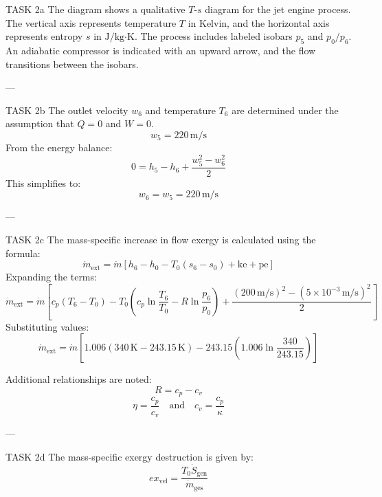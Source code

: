 TASK 2a  
The diagram shows a qualitative \( T \)-\( s \) diagram for the jet engine process. The vertical axis represents temperature \( T \) in Kelvin, and the horizontal axis represents entropy \( s \) in \( \text{J/kg·K} \). The process includes labeled isobars \( p_5 \) and \( p_0/p_6 \). An adiabatic compressor is indicated with an upward arrow, and the flow transitions between the isobars.  

---

TASK 2b  
The outlet velocity \( w_6 \) and temperature \( T_6 \) are determined under the assumption that \( Q = 0 \) and \( W = 0 \).  
\[
w_5 = 220 \, \text{m/s}
\]  
From the energy balance:  
\[
0 = h_5 - h_6 + \frac{w_5^2 - w_6^2}{2}
\]  
This simplifies to:  
\[
w_6 = w_5 = 220 \, \text{m/s}
\]  

---

TASK 2c  
The mass-specific increase in flow exergy is calculated using the formula:  
\[
\dot{m}_{\text{ext}} = \dot{m} \left[ h_6 - h_0 - T_0 (s_6 - s_0) + \text{ke} + \text{pe} \right]
\]  
Expanding the terms:  
\[
\dot{m}_{\text{ext}} = \dot{m} \left[ c_p (T_6 - T_0) - T_0 \left( c_p \ln \frac{T_6}{T_0} - R \ln \frac{p_6}{p_0} \right) + \frac{(200 \, \text{m/s})^2 - (5 \times 10^{-3} \, \text{m/s})^2}{2} \right]
\]  
Substituting values:  
\[
\dot{m}_{\text{ext}} = \dot{m} \left[ 1.006 (340 \, \text{K} - 243.15 \, \text{K}) - 243.15 \left( 1.006 \ln \frac{340}{243.15} \right) \right]
\]  

Additional relationships are noted:  
\[
R = c_p - c_v
\]  
\[
\eta = \frac{c_p}{c_v} \quad \text{and} \quad c_v = \frac{c_p}{\kappa}
\]  

---

TASK 2d  
The mass-specific exergy destruction is given by:  
\[
ex_{\text{vel}} = \frac{T_0 \dot{S}_{\text{gen}}}{\dot{m}_{\text{ges}}}
\]  